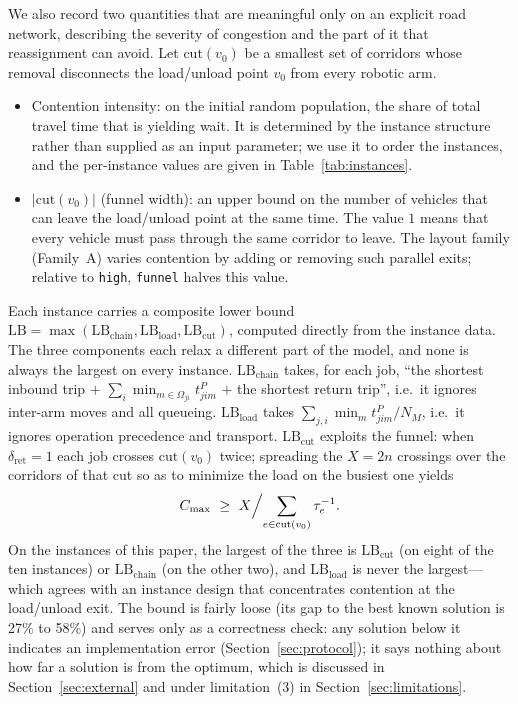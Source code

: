 \documentclass[manuscript,screen,review]{acmart}
\newcommand{\LBGapLo}{27\%}
\newcommand{\LBGapHi}{58\%}
\begin{document}
We also record two quantities that are meaningful only on an explicit road network, describing the severity of congestion and the part of it that reassignment can avoid.
Let $\mathrm{cut}(v_0)$ be a smallest set of corridors whose removal disconnects the load/unload point $v_0$ from every robotic arm.

\begin{itemize}[leftmargin=*,topsep=2pt,itemsep=1pt]
  \item Contention intensity: on the initial random population, the share of total travel time that is yielding wait. It is determined by the instance structure rather than supplied as an input parameter; we use it to order the instances, and the per-instance values are given in Table~\ref{tab:instances}.
  \item $|\mathrm{cut}(v_0)|$ (funnel width): an upper bound on the number of vehicles that can leave the load/unload point at the same time. The value $1$ means that every vehicle must pass through the same corridor to leave. The layout family (Family~A) varies contention by adding or removing such parallel exits; relative to \texttt{high}, \texttt{funnel} halves this value.
\end{itemize}

Each instance carries a composite lower bound
$\mathrm{LB}=\max(\mathrm{LB}_{\text{chain}},\mathrm{LB}_{\text{load}},
\mathrm{LB}_{\text{cut}})$, computed directly from the instance data. The three components each relax a different part of the model, and none is always the largest on every instance.
$\mathrm{LB}_{\text{chain}}$ takes, for each job, ``the shortest inbound trip $+$
$\sum_i \min_{m\in\Omega_{ji}}t^P_{jim}$ $+$ the shortest return trip'', i.e.\ it ignores inter-arm moves and all queueing.
$\mathrm{LB}_{\text{load}}$ takes $\sum_{j,i}\min_m t^P_{jim}/N_M$, i.e.\ it ignores operation precedence and transport.
$\mathrm{LB}_{\text{cut}}$ exploits the funnel: when $\delta_{\mathrm{ret}}=1$ each job crosses
$\mathrm{cut}(v_0)$ twice; spreading the $X=2n$ crossings over the corridors of that cut so as to minimize the load on the busiest one yields
\begin{equation}
\label{eq:lbcut}
C_{\max}\ \ge\ X\Bigl/\sum_{e\in \mathrm{cut}(v_0)}\tau_e^{-1}.
\end{equation}
On the instances of this paper, the largest of the three is $\mathrm{LB}_{\text{cut}}$ (on eight of the ten instances) or
$\mathrm{LB}_{\text{chain}}$ (on the other two), and $\mathrm{LB}_{\text{load}}$ is never the largest---which agrees with an instance design that concentrates contention at the load/unload exit.
The bound is fairly loose (its gap to the best known solution is \LBGapLo{} to \LBGapHi{}) and serves only as a correctness check: any solution below it indicates an implementation error (Section~\ref{sec:protocol}); it says nothing about how far a solution is from the optimum, which is discussed in Section~\ref{sec:external} and under limitation~(3) in Section~\ref{sec:limitations}.
\end{document}
